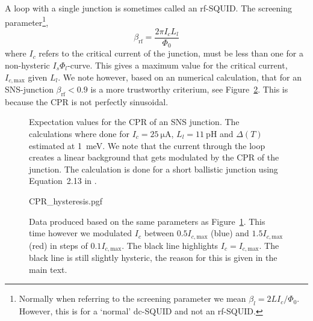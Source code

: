 A loop with a single junction is sometimes called an rf-SQUID\cite{clarkeSQUIDHandbook2004}. The screening parameter\footnote{Normally when referring to the screening parameter we mean $\beta_l = 2LI_c/\Phi_0$. However, this is for a `normal' dc-SQUID and not an rf-SQUID.},
\begin{equation}
	\beta_{\text{rf}} = \frac{2\pi I_c L_l}{\Phi_0}
\end{equation}
where $I_c$ refers to the critical current of the junction, must be less than one for a non-hysteric $I_s\Phi_l$-curve\cite{clarkeSQUIDHandbook2004,frolovMeasurementCurrentPhaseRelation2004}. This gives a maximum value for the critical current, $I_{c,\text{max}}$ given $L_l$. We note however, based on an numerical calculation, that for an SNS-junction $\beta_{\text{rf}} < 0.9$ is a more trustworthy criterium, see Figure~\ref{fig:CPR-hysteresis}. This is because the CPR is not perfectly sinusoidal\cite{vermeerSTMbasedScanningSQUID2021,likharevSuperconductingWeakLinks1979}.

\begin{figure}[ht!]
	

	\caption{Expectation values for the CPR of an SNS junction. The calculations where done for $I_c=\qty{25}{\micro\ampere}$, $L_l=\qty{11}{\pico\henry}$ and $\Delta(T)$ estimated at \qty{1}{\milli\electronvolt}. We note that the current through the loop creates a linear background that gets modulated by the CPR of the junction. The calculation is done for a short ballistic junction using Equation~2.13 in \cite{vermeerSTMbasedScanningSQUID2021}.}
	\label{fig:analytical-prediction}
\end{figure}

\begin{figure}
	\centering
	{CPR_hysteresis.pgf}
	\caption{Data produced based on the same parameters as Figure~\ref{fig:analytical-prediction}. This time however we modulated $I_c$ between $0.5I_{c,\text{max}}$ (blue) and $1.5I_{c,\text{max}}$ (red) in steps of $0.1I_{c,\text{max}}$. The black line highlights $I_c=I_{c,\text{max}}$. The black line is still slightly hysteric, the reason for this is given in the main text.}
	\label{fig:CPR-hysteresis}
\end{figure}

